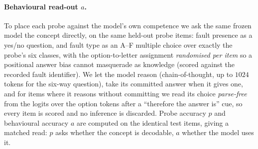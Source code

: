 \paragraph{Behavioural read-out \texorpdfstring{$a$}{a}.} To place each probe against the model's own competence we ask the same frozen model the concept directly, on the same held-out probe items: fault presence as a yes/no question, and fault type as an A--F multiple choice over exactly the probe's six classes, with the option-to-letter assignment \emph{randomised per item} so a positional answer bias cannot masquerade as knowledge (scored against the recorded fault identifier). We let the model reason (chain-of-thought, up to $1024$ tokens for the six-way question), take its committed answer when it gives one, and for items where it reasons without committing we read its choice \emph{parse-free} from the logits over the option tokens after a ``therefore the answer is'' cue, so every item is scored and no inference is discarded. Probe accuracy $p$ and behavioural accuracy $a$ are computed on the identical test items, giving a matched read: $p$ asks whether the concept is decodable, $a$ whether the model uses it.

